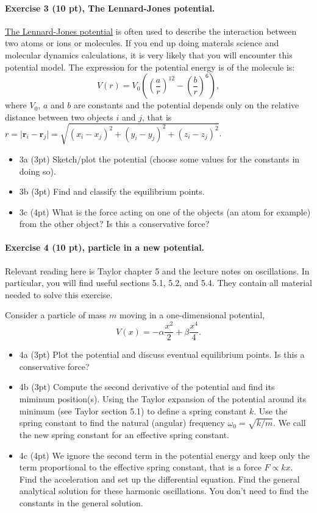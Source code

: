 \documentclass[%
oneside,                 %
final,                   %
10pt]{article}
\begin{document}
\noindent
\paragraph{Exercise 3 (10 pt), The Lennard-Jones potential.}
\href{{https://en.wikipedia.org/wiki/Lennard-Jones_potential}}{The Lennard-Jones potential} is often used to describe
the interaction between two atoms or ions or molecules. If you end up doing materals science and molecular dynamics calculations, it is very likely that you will encounter this potential model.
The expression for the potential energy is
of the molecule is:
\[
V(r) = V_0\left((\frac{a}{r})^{12}-(\frac{b}{r})^{6}\right),
\]
where $V_0$, $a$ and $b$ are constants and the potential depends only on the relative distance between two objects
$i$ and $j$, that is $r=\vert\bm{r}_i-\bm{r}_j\vert=\sqrt{(x_i-x_j)^2+(y_i-y_j)^2+(z_i-z_j)^2}$.

\begin{itemize}
\item 3a (3pt) Sketch/plot the potential (choose some values for the constants in doing so).

\item 3b (3pt) Find and classify the equilibrium points.

\item 3c (4pt) What is the force acting on one of the objects (an atom for example) from the other object? Is this a conservative force?
\end{itemize}

\noindent
\paragraph{Exercise 4 (10 pt), particle in a new potential.}
Relevant reading here is Taylor chapter 5 and the lecture notes on oscillations. In particular, you will find useful  sections 5.1, 5.2, and 5.4. They contain all material needed to solve this exercise.

Consider a particle of mass $m$ moving in a one-dimensional potential,
\[
V(x)=-\alpha\frac{x^2}{2}+\beta\frac{x^4}{4}.
\]

\begin{itemize}
\item 4a (3pt) Plot the potential and discuss eventual equilibrium points. Is this a conservative force?

\item 4b (3pt) Compute the second derivative of the potential and find its miminum position(s). Using the Taylor expansion of the potential around its minimum (see Taylor section 5.1) to define a spring constant $k$. Use the spring constant to find the natural (angular) frequency $\omega_0=\sqrt{k/m}$. We call the new spring constant for  an effective spring constant. 

\item 4c (4pt) We ignore the second term in the potential energy and keep only the term proportional to the effective spring constant, that is a force $F\propto kx$. Find the acceleration and set up the differential equation.  Find the general analytical solution for these harmonic oscillations.  You don't need to find the constants in the general solution.
\end{itemize}
\end{document}
